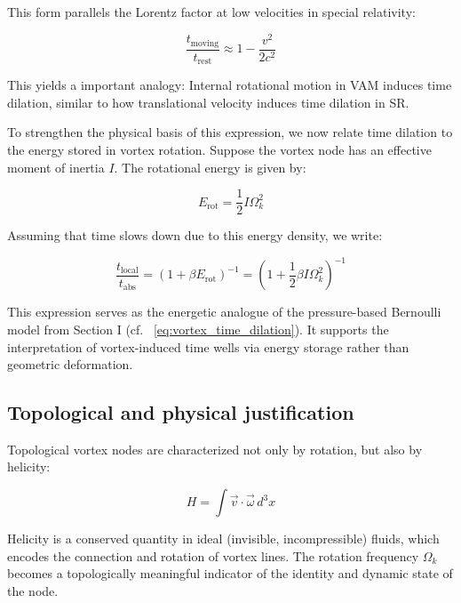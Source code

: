 This form parallels the Lorentz factor at low velocities in special relativity:

\begin{equation}
    \frac{t_{\text{moving}}}{t_{\text{rest}}} \approx 1 - \frac{v^2}{2c^2}\label{eq:parallels_lorentz_time_dilation}
\end{equation}

This yields a important analogy: Internal rotational motion in VAM induces time dilation, similar to how translational velocity induces time dilation in SR.

To strengthen the physical basis of this expression, we now relate time dilation to the energy stored in vortex rotation. Suppose the vortex node has an effective moment of inertia $I$. The rotational energy is given by:

\begin{equation}
    E_{\text{rot}} = \frac{1}{2} I \Omega_k^2\label{eq:rotational_energy_inertia}
\end{equation}

Assuming that time slows down due to this energy density, we write:

\begin{equation}
    \frac{t_{\text{local}}}{t_{\text{abs}}} = \left(1 + \beta E_{\text{rot}} \right)^{-1} = \left(1 + \frac{1}{2} \beta I \Omega_k^2 \right)^{-1}\label{eq:time_dilation_rotational_energy_inertia}
\end{equation}

This expression serves as the energetic analogue of the pressure-based Bernoulli model from Section I (cf. ~\eqref{eq:vortex_time_dilation}). It supports the interpretation of vortex-induced time wells via energy storage rather than geometric deformation.

\subsection{Topological and physical justification}

Topological vortex nodes are characterized not only by rotation, but also by helicity:

\begin{equation}
    H = \int \vec{v} \cdot \vec{\omega} \, d^3x \label{eq:helicity_rotation}
\end{equation}

Helicity is a conserved quantity in ideal (invisible, incompressible) fluids, which encodes the connection and rotation of vortex lines. The rotation frequency $\Omega_k$ becomes a topologically meaningful indicator of the identity and dynamic state of the node.

